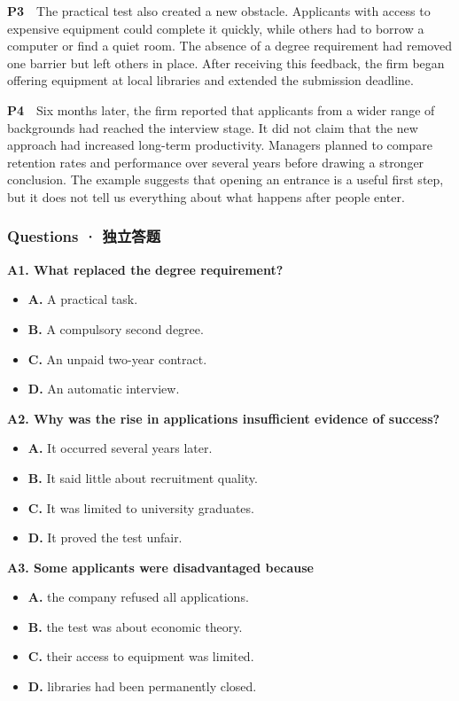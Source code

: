 \documentclass[
  11pt,
]{ctexart}
\begin{document}
\textbf{P3}　The practical test also created a new obstacle. Applicants
with access to expensive equipment could complete it quickly, while
others had to borrow a computer or find a quiet room. The absence of a
degree requirement had removed one barrier but left others in place.
After receiving this feedback, the firm began offering equipment at
local libraries and extended the submission deadline.

\textbf{P4}　Six months later, the firm reported that applicants from a
wider range of backgrounds had reached the interview stage. It did not
claim that the new approach had increased long-term productivity.
Managers planned to compare retention rates and performance over several
years before drawing a stronger conclusion. The example suggests that
opening an entrance is a useful first step, but it does not tell us
everything about what happens after people enter.

\subsubsection{Questions ·
独立答题}\label{questions-ux72ecux7acbux7b54ux9898}

\textbf{A1. What replaced the degree requirement?}

\begin{itemize}
\item
  \textbf{A.} A practical task.
\item
  \textbf{B.} A compulsory second degree.
\item
  \textbf{C.} An unpaid two-year contract.
\item
  \textbf{D.} An automatic interview.
\end{itemize}

\textbf{A2. Why was the rise in applications insufficient evidence of
success?}

\begin{itemize}
\item
  \textbf{A.} It occurred several years later.
\item
  \textbf{B.} It said little about recruitment quality.
\item
  \textbf{C.} It was limited to university graduates.
\item
  \textbf{D.} It proved the test unfair.
\end{itemize}

\textbf{A3. Some applicants were disadvantaged because}

\begin{itemize}
\item
  \textbf{A.} the company refused all applications.
\item
  \textbf{B.} the test was about economic theory.
\item
  \textbf{C.} their access to equipment was limited.
\item
  \textbf{D.} libraries had been permanently closed.
\end{itemize}
\end{document}
